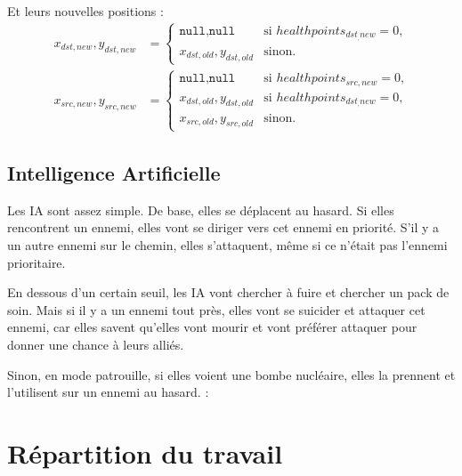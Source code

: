\documentclass{article}
\begin{document}
Et leurs nouvelles positions : 
\begin{align}
     x_{dst,new},y_{dst,new} &=
     \begin{cases}
        \texttt{null},\texttt{null} & \text{si } healthpoints_{dst_,new} = 0 \text{,}\\
        x_{dst,old},y_{dst,old} & \text{sinon.} 
     \end{cases} \\
     x_{src,new},y_{src,new} &=
     \begin{cases}
        \texttt{null},\texttt{null} & \text{si } healthpoints_{src,new} = 0 \text{,}\\
        x_{dst,old},y_{dst,old} & \text{si } healthpoints_{dst_,new} = 0 \text{,}\\
        x_{src,old},y_{src,old} & \text{sinon.} 
     \end{cases}
\end{align}

\subsection{Intelligence Artificielle}
Les IA sont assez simple. De base, elles se déplacent au hasard.
Si elles rencontrent un ennemi, elles vont se diriger vers cet ennemi en priorité. S'il y a un
autre ennemi sur le chemin, elles s'attaquent, même si ce n'était pas l'ennemi prioritaire.

En dessous d'un certain seuil, les IA vont chercher à fuire et chercher un pack de soin. Mais si il y a un ennemi
tout près, elles vont se suicider et attaquer cet ennemi, car elles savent qu'elles vont mourir et vont préférer attaquer 
pour donner une chance à leurs alliés.

Sinon, en mode patrouille, si elles voient une bombe nucléaire, elles la prennent et l'utilisent sur un ennemi au hasard.
:
\section{Répartition du travail}
\end{document}
